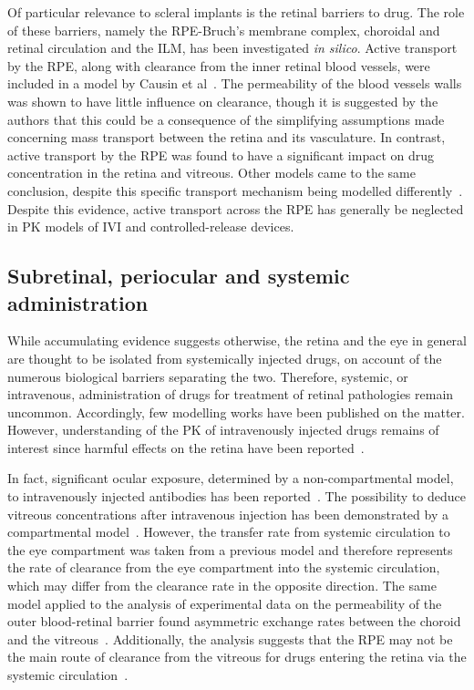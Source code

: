 \documentclass{article}
\begin{document}
Of particular relevance to scleral implants is the retinal barriers to drug.
The role of these barriers, namely the RPE-Bruch's membrane complex, choroidal and retinal circulation and the ILM, has been investigated \textit{in silico}.
Active transport by the RPE, along with clearance from the inner retinal blood vessels, were included in a model by Causin et al~\cite{Causin_2016}.
The permeability of the blood vessels walls was shown to have little influence on clearance, though it is suggested by the authors that this could be a consequence of the simplifying assumptions made concerning mass transport between the retina and its vasculature.
In contrast, active transport by the RPE was found to have a significant impact on drug concentration in the retina and vitreous.
Other models came to the same conclusion, despite this specific transport mechanism being modelled differently~\cite{Balachandran_2008,Kotha_2014}.
Despite this evidence, active transport across the RPE has generally be neglected in PK models of IVI and controlled-release devices.


\subsection{Subretinal, periocular and systemic administration}

While accumulating evidence suggests otherwise, the retina and the eye in general are thought to be isolated from systemically injected drugs, on account of the numerous biological barriers separating the two.
Therefore, systemic, or intravenous, administration of drugs for treatment of retinal pathologies remain uncommon.
Accordingly, few modelling works have been published on the matter.
However, understanding of the PK of intravenously injected drugs remains of interest since harmful effects on the retina have been reported~\cite{Fu_2017}.

In fact, significant ocular exposure, determined by a non-compartmental model, to intravenously injected antibodies has been reported~\cite{Shivva_2021}.
The possibility to deduce vitreous concentrations after intravenous injection has been demonstrated by a compartmental model~\cite{Vellonen_2015}.
However, the transfer rate from systemic circulation to the eye compartment was taken from a previous model and therefore represents the rate of clearance from the eye compartment into the systemic circulation, which may differ from the clearance rate in the opposite direction.
The same model applied to the analysis of experimental data on the permeability of the outer blood-retinal barrier found asymmetric exchange rates between the choroid and the vitreous~\cite{Ramsay_2019}.
Additionally, the analysis suggests that the RPE may not be the main route of clearance from the vitreous for drugs entering the retina via the systemic circulation~\cite{Ramsay_2019}.
\end{document}
